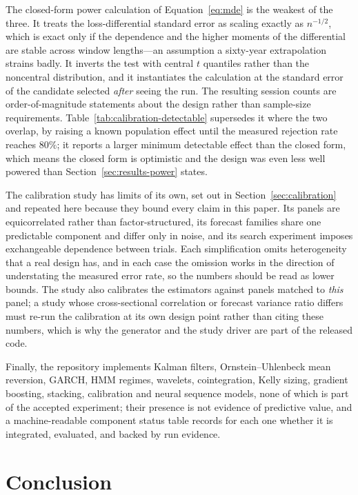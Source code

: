 \documentclass{article}
\theoremstyle{plain}
\theoremstyle{remark}
\begin{document}
The closed-form power calculation of Equation~\ref{eq:mde} is the weakest of the
three. It treats the loss-differential standard error as scaling exactly as
$n^{-1/2}$, which is exact only if the dependence and the higher moments of the
differential are stable across window lengths---an assumption a sixty-year
extrapolation strains badly. It inverts the test with central $t$ quantiles
rather than the noncentral distribution, and it instantiates the calculation at
the standard error of the candidate selected \emph{after} seeing the run. The
resulting session counts are order-of-magnitude statements about the design
rather than sample-size requirements. Table~\ref{tab:calibration-detectable}
supersedes it where the two overlap, by raising a known population effect until
the measured rejection rate reaches $80\%$; it reports a larger minimum
detectable effect than the closed form, which means the closed form is
optimistic and the design was even less well powered than
Section~\ref{sec:results-power} states.

The calibration study has limits of its own, set out in
Section~\ref{sec:calibration} and repeated here because they bound every claim
in this paper. Its panels are equicorrelated rather than factor-structured, its
forecast families share one predictable component and differ only in noise, and
its search experiment imposes exchangeable dependence between trials. Each
simplification omits heterogeneity that a real design has, and in each case the
omission works in the direction of understating the measured error rate, so the
numbers should be read as lower bounds. The study also calibrates the estimators
against panels matched to \emph{this} panel; a study whose cross-sectional
correlation or forecast variance ratio differs must re-run the calibration at
its own design point rather than citing these numbers, which is why the
generator and the study driver are part of the released code.

Finally, the repository implements Kalman filters, Ornstein--Uhlenbeck mean
reversion, GARCH, HMM regimes, wavelets, cointegration, Kelly sizing, gradient
boosting, stacking, calibration and neural sequence models, none of which is part
of the accepted experiment; their presence is not evidence of predictive value,
and a machine-readable component status table records for each one whether it is
integrated, evaluated, and backed by run evidence.

\section{Conclusion}
\end{document}

